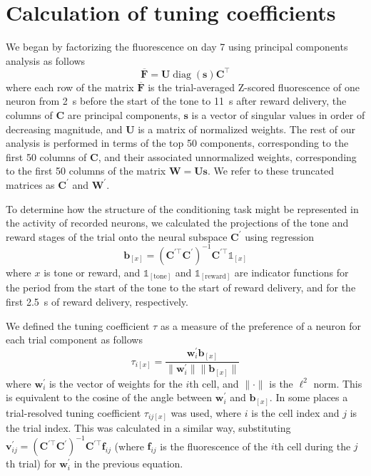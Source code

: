 \documentclass{article}
\DeclareMathOperator{\diag}{diag}
\begin{document}
\section{Calculation of tuning coefficients}

We began by factorizing the fluorescence on day 7 using principal components
analysis as follows
\begin{equation}
    \overline{\mathbf{F}} = \mathbf{U} \diag{(\mathbf{s})} \mathbf{C}^\top
\end{equation}
where each row of the matrix $\overline{\mathbf{F}}$ is the trial-averaged
Z-scored fluorescence of one neuron from \SI{2}{\s} before the start of the tone
to \SI{11}{\s} after reward delivery, the columns of $\mathbf{C}$ are principal
components, $\mathbf{s}$ is a vector of singular values in order of decreasing
magnitude, and $\mathbf{U}$ is a matrix of normalized weights. The rest of our
analysis is performed in terms of the top 50 components, corresponding to the
first 50 columns of $\mathbf{C}$, and their associated unnormalized weights,
corresponding to the first 50 columns of the matrix $\mathbf{W} = \mathbf{Us}$.
We refer to these truncated matrices as $\mathbf{C}^\prime$ and
$\mathbf{W}^\prime$.

To determine how the structure of the conditioning task might be represented in
the activity of recorded neurons, we calculated the projections of the tone and
reward stages of the trial onto the neural subspace $\mathbf{C}^\prime$ using
regression
\begin{equation}
    \mathbf{b}_{[x]} =
    ( \mathbf{C}^{\prime\top}\mathbf{C}^\prime )^{-1}
    \mathbf{C}^{\prime\top} \mathds{1}_{[x]}
\end{equation}
where $x$ is tone or reward, and $\mathds{1}_{[\text{tone}]}$ and
$\mathds{1}_{[\text{reward}]}$ are indicator functions for the period from the
start of the tone to the start of reward delivery, and for the first
\SI{2.5}{\s} of reward delivery, respectively.

We defined the tuning coefficient $\tau$ as a measure of the preference of a
neuron for each trial component as follows
\begin{equation}
    \tau_{i[x]} = \frac{\mathbf{w}_i^\prime \mathbf{b}_{[x]}}{\lVert
    \mathbf{w}_i^\prime \rVert \lVert \mathbf{b}_{[x]} \rVert}
\end{equation}
where $\mathbf{w}_i^\prime$ is the vector of weights for the $i$th cell, and
$\lVert \cdot \rVert$ is the $\ell^2$ norm. This is equivalent to the cosine of
the angle between $\mathbf{w}_i^\prime$ and $\mathbf{b}_{[x]}$. In some places
a trial-resolved tuning coefficient $\tau_{ij[x]}$ was used, where $i$ is the
cell index and $j$ is the trial index. This was calculated in a similar way,
substituting $\mathbf{v}_{ij}^\prime = \left(\mathbf{C}^{\prime\top}\mathbf{C}^\prime
\right)^{-1} \mathbf{C}^{\prime\top} \mathbf{f}_{ij}$ (where $\mathbf{f}_{ij}$
is the fluorescence of the $i$th cell during the $j$th trial) for
$\mathbf{w}_i^\prime$ in the previous equation.
\end{document}

